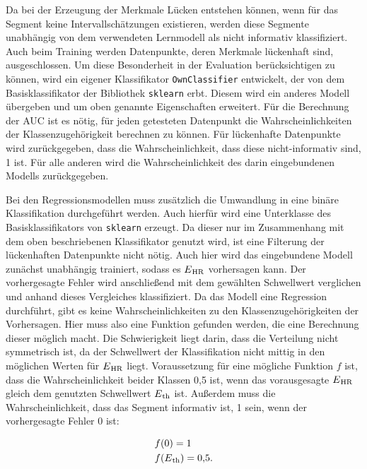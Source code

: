Da bei der Erzeugung der Merkmale Lücken entstehen können, wenn für das Segment keine Intervallschätzungen existieren, werden diese Segmente unabhängig von dem verwendeten Lernmodell als nicht informativ klassifiziert. Auch beim Training werden Datenpunkte, deren Merkmale lückenhaft sind, ausgeschlossen. Um diese Besonderheit in der Evaluation berücksichtigen zu können, wird ein eigener Klassifikator \texttt{OwnClassifier} entwickelt, der von dem Basisklassifikator der Bibliothek \texttt{sklearn} erbt. Diesem wird ein anderes Modell übergeben und um oben genannte Eigenschaften erweitert. Für die Berechnung der \ac{AUC} ist es nötig, für jeden getesteten Datenpunkt die Wahrscheinlichkeiten der Klassenzugehörigkeit berechnen zu können. Für lückenhafte Datenpunkte wird zurückgegeben, dass die Wahrscheinlichkeit, dass diese nicht-informativ sind, 1 ist. Für alle anderen wird die Wahrscheinlichkeit des darin eingebundenen Modells zurückgegeben.%

Bei den Regressionsmodellen muss zusätzlich die Umwandlung in eine binäre Klassifikation durchgeführt werden.  Auch hierfür wird eine Unterklasse des Basisklassifikators von \texttt{sklearn} erzeugt. Da dieser nur im Zusammenhang mit dem oben beschriebenen Klassifikator genutzt wird, ist eine Filterung der lückenhaften Datenpunkte nicht nötig. Auch hier wird das eingebundene Modell zunächst unabhängig trainiert, sodass es $E\textsubscript{HR}$ vorhersagen kann. Der vorhergesagte Fehler wird anschließend mit dem gewählten Schwellwert verglichen und anhand dieses Vergleiches klassifiziert. Da das Modell eine Regression durchführt, gibt es keine Wahrscheinlichkeiten zu den Klassenzugehörigkeiten der Vorhersagen. Hier muss also eine Funktion gefunden werden, die eine Berechnung dieser möglich macht. Die Schwierigkeit liegt darin, dass die Verteilung nicht symmetrisch ist, da der Schwellwert der Klassifikation nicht mittig in den möglichen Werten für $E\textsubscript{HR}$ liegt. Voraussetzung für eine mögliche Funktion $f$ ist, dass die Wahrscheinlichkeit beider Klassen 0,5 ist, wenn das vorausgesagte $E\textsubscript{HR}$ gleich dem genutzten Schwellwert $E\textsubscript{th}$ ist. Außerdem muss die Wahrscheinlichkeit, dass das Segment informativ ist, 1 sein, wenn der vorhergesagte Fehler 0 ist:

\begin{align*}
	&f(0) = 1\\
	&f(E\textsubscript{th}) = 0{,}5\text{.}
\end{align*}


